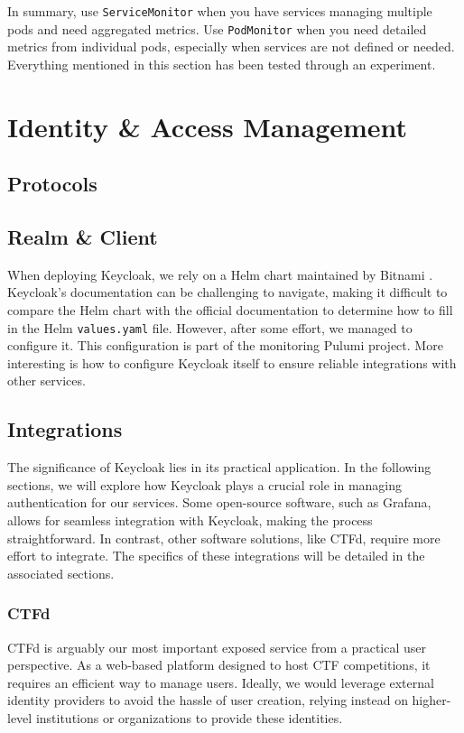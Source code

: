 In summary, use \texttt{ServiceMonitor} when you have services managing multiple pods and need aggregated metrics. Use \texttt{PodMonitor} when you need detailed metrics from individual pods, especially when services are not defined or needed. Everything mentioned in this section has been tested through an experiment.

\chapter{Identity \& Access Management}
\section{Protocols}

\section{Realm \& Client}
When deploying Keycloak, we rely on a Helm chart maintained by Bitnami \parencite{bitnami_keycloak}. Keycloak's documentation can be challenging to navigate, making it difficult to compare the Helm chart with the official documentation to determine how to fill in the Helm \texttt{values.yaml} file. However, after some effort, we managed to configure it. This configuration is part of the monitoring Pulumi project. More interesting is how to configure Keycloak itself to ensure reliable integrations with other services.

\newpage

\section{Integrations}
The significance of Keycloak lies in its practical application. In the following sections, we will explore how Keycloak plays a crucial role in managing authentication for our services. Some open-source software, such as Grafana, allows for seamless integration with Keycloak, making the process straightforward. In contrast, other software solutions, like CTFd, require more effort to integrate. The specifics of these integrations will be detailed in the associated sections.

\subsection{CTFd}
CTFd is arguably our most important exposed service from a practical user perspective. As a web-based platform designed to host CTF competitions, it requires an efficient way to manage users. Ideally, we would leverage external identity providers to avoid the hassle of user creation, relying instead on higher-level institutions or organizations to provide these identities.

